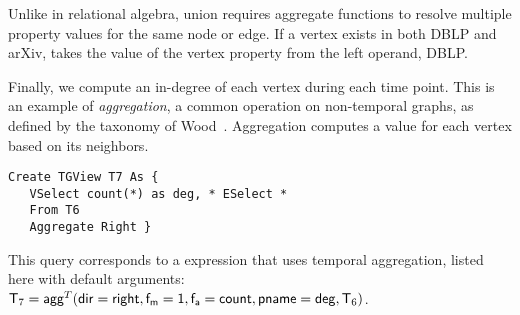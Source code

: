 Unlike in relational algebra, \tga union requires aggregate functions
to resolve multiple property values for the same node or edge.  If a
vertex exists in both DBLP and arXiv,  takes the value of
the vertex property  from the left operand, DBLP.

\begin{example}
\label{ex:agg}
\vspace{-0.1cm}

Finally, we compute an in-degree of each vertex during each time
point.  This is an example of {\em aggregation}, a common operation on
non-temporal graphs, as defined by the taxonomy of
Wood~\cite{Wood2012}.  Aggregation computes a value for each vertex
based on its neighbors.

\begin{small} 
\begin{verbatim}
Create TGView T7 As { 
   VSelect count(*) as deg, * ESelect *
   From T6
   Aggregate Right }
\end{verbatim}
\vspace{-0.1cm}
\end{small}

This query corresponds to a \tga expression that uses temporal
aggregation, listed here with default arguments: $\mathsf{T}_7 =
\textsf{agg}^T(\mathsf{dir=right},\mathsf{f_m=1},\mathsf{f_a=count},\mathsf{pname=deg},\mathsf{T}_6)$.

\vspace{-0.1cm}
\end{example}




